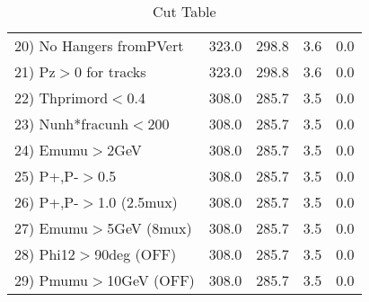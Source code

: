 \begin{table}[h!]
\begin{tabular}{||l||r|r|r|r||}
 20) No Hangers fromPVert &       323.0 &       298.8 &         3.6 &         0.0 \\
 21) Pz$>$0 for tracks    &       323.0 &       298.8 &         3.6 &         0.0 \\
 22) Thprimord$<$0.4      &       308.0 &       285.7 &         3.5 &         0.0 \\
 23) Nunh*fracunh$<$200   &       308.0 &       285.7 &         3.5 &         0.0 \\
 24) Emumu$>$2GeV         &       308.0 &       285.7 &         3.5 &         0.0 \\
 25) P+,P-$>$0.5          &       308.0 &       285.7 &         3.5 &         0.0 \\
 26) P+,P-$>$1.0 (2.5mux) &       308.0 &       285.7 &         3.5 &         0.0 \\
 27) Emumu$>$5GeV  (8mux) &       308.0 &       285.7 &         3.5 &         0.0 \\
 28) Phi12$>$90deg  (OFF) &       308.0 &       285.7 &         3.5 &         0.0 \\
 29) Pmumu$>$10GeV  (OFF) &       308.0 &       285.7 &         3.5 &         0.0 \\
 \hline
 \hline
 \end{tabular}
 \caption{Cut Table \cohpip }
 \label{tab-cut_copip}
 \end{table}
